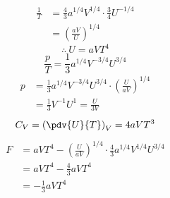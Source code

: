 \begin{align*}
\frac{1}{T}&=\frac{4}{3}a^{1/4}V^{1/4}\cdot\frac{3}{4}U^{-1/4}\\
&=\left(\frac{aV}{U}\right)^{1/4}
\end{align*}
\[ \therefore\ U=aVT^{4} \]
\[ \frac{p}{T}=\frac{1}{3}a^{1/4}V^{-3/4}U^{3/4} \]
\begin{align*}
p&=\frac{1}{3}a^{1/4}V^{-3/4}U^{3/4}\cdot\left(\frac{U}{aV}\right)^{1/4}\\
&=\frac{1}{3}V^{-1}U^{1}=\frac{U}{3V}
\end{align*}
\[ C_{V}=\left(\pdv{U}{T}\right)_{V}=4aVT^{3} \]
\begin{align*}
F&=aVT^{4}-\left(\frac{U}{aV}\right)^{1/4}\cdot\frac{4}{3}a^{1/4}V^{1/4}U^{3/4}\\
&=aVT^{4}-\frac{4}{3}aVT^{4}\\
&=-\frac{1}{3}aVT^{4}
\end{align*}
